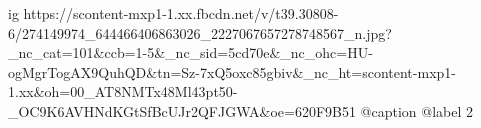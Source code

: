  
 
 
 
 

\ifcmt
  ig https://scontent-mxp1-1.xx.fbcdn.net/v/t39.30808-6/274149974_644466406863026_2227067657278748567_n.jpg?_nc_cat=101&ccb=1-5&_nc_sid=5cd70e&_nc_ohc=HU-ogMgrTogAX9QuhQD&tn=Sz-7xQ5oxc85gbiv&_nc_ht=scontent-mxp1-1.xx&oh=00_AT8NMTx48Ml43pt50-_OC9K6AVHNdKGtSfBcUJr2QFJGWA&oe=620F9B51
  @caption @label 2
\fi

